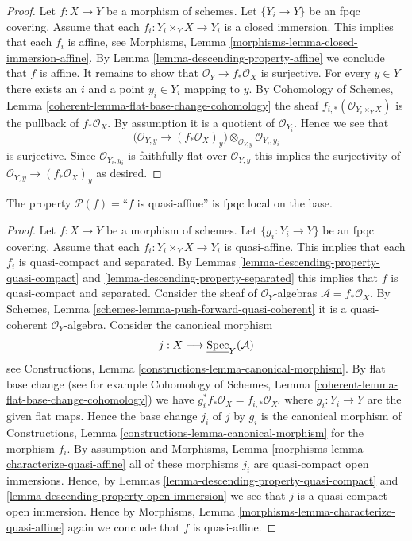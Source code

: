 \begin{proof}
Let $f : X \to Y$ be a morphism of schemes.
Let $\{Y_i \to Y\}$ be an fpqc covering.
Assume that each $f_i : Y_i \times_Y X \to Y_i$
is a closed immersion.
This implies that each $f_i$ is affine, see
Morphisms, Lemma \ref{morphisms-lemma-closed-immersion-affine}.
By Lemma \ref{lemma-descending-property-affine}
we conclude that $f$ is affine. It remains to show that
$\mathcal{O}_Y \to f_*\mathcal{O}_X$ is surjective.
For every $y \in Y$ there exists an $i$ and a point
$y_i \in Y_i$ mapping to $y$.
By Cohomology of Schemes, Lemma \ref{coherent-lemma-flat-base-change-cohomology}
the sheaf $f_{i, *}(\mathcal{O}_{Y_i \times_Y X})$
is the pullback of $f_*\mathcal{O}_X$.
By assumption it is a quotient of $\mathcal{O}_{Y_i}$.
Hence we see that
$$
\Big(
\mathcal{O}_{Y, y} \longrightarrow (f_*\mathcal{O}_X)_y
\Big)
\otimes_{\mathcal{O}_{Y, y}} \mathcal{O}_{Y_i, y_i}
$$
is surjective. Since $\mathcal{O}_{Y_i, y_i}$ is faithfully
flat over $\mathcal{O}_{Y, y}$ this implies the surjectivity
of $\mathcal{O}_{Y, y} \longrightarrow (f_*\mathcal{O}_X)_y$ as
desired.
\end{proof}

\begin{lemma}
\label{lemma-descending-property-quasi-affine}
The property $\mathcal{P}(f) =$``$f$ is quasi-affine''
is fpqc local on the base.
\end{lemma}

\begin{proof}
Let $f : X \to Y$ be a morphism of schemes.
Let $\{g_i : Y_i \to Y\}$ be an fpqc covering.
Assume that each $f_i : Y_i \times_Y X \to Y_i$
is quasi-affine.
This implies that each $f_i$ is quasi-compact and separated.
By Lemmas \ref{lemma-descending-property-quasi-compact}
and \ref{lemma-descending-property-separated}
this implies that $f$ is quasi-compact and separated.
Consider the sheaf of $\mathcal{O}_Y$-algebras
$\mathcal{A} = f_*\mathcal{O}_X$.
By Schemes, Lemma \ref{schemes-lemma-push-forward-quasi-coherent}
it is a quasi-coherent $\mathcal{O}_Y$-algebra.
Consider the canonical morphism
$$
j : X \longrightarrow \underline{\mathop{\mathrm{Spec}}}_Y(\mathcal{A})
$$
see Constructions, Lemma \ref{constructions-lemma-canonical-morphism}.
By flat base change
(see for example
Cohomology of Schemes, Lemma \ref{coherent-lemma-flat-base-change-cohomology})
we have $g_i^*f_*\mathcal{O}_X = f_{i, *}\mathcal{O}_{X'}$
where $g_i : Y_i \to Y$ are the given flat
maps. Hence the base change $j_i$ of $j$ by $g_i$ is the canonical
morphism of Constructions, Lemma \ref{constructions-lemma-canonical-morphism}
for the morphism $f_i$. By assumption and
Morphisms, Lemma \ref{morphisms-lemma-characterize-quasi-affine}
all of these
morphisms $j_i$ are quasi-compact open immersions. Hence, by
Lemmas \ref{lemma-descending-property-quasi-compact} and
\ref{lemma-descending-property-open-immersion} we
see that $j$ is a quasi-compact open immersion.
Hence by
Morphisms, Lemma \ref{morphisms-lemma-characterize-quasi-affine}
again we conclude that $f$ is quasi-affine.
\end{proof}

